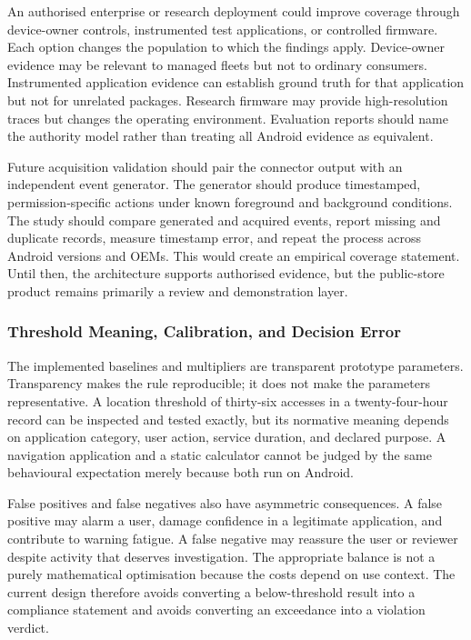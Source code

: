 An authorised enterprise or research deployment could improve coverage through device-owner controls, instrumented test applications, or controlled firmware. Each option changes the population to which the findings apply. Device-owner evidence may be relevant to managed fleets but not to ordinary consumers. Instrumented application evidence can establish ground truth for that application but not for unrelated packages. Research firmware may provide high-resolution traces but changes the operating environment. Evaluation reports should name the authority model rather than treating all Android evidence as equivalent.

Future acquisition validation should pair the connector output with an independent event generator. The generator should produce timestamped, permission-specific actions under known foreground and background conditions. The study should compare generated and acquired events, report missing and duplicate records, measure timestamp error, and repeat the process across Android versions and OEMs. This would create an empirical coverage statement. Until then, the architecture supports authorised evidence, but the public-store product remains primarily a review and demonstration layer.

\subsubsection{Threshold Meaning, Calibration, and Decision Error}

The implemented baselines and multipliers are transparent prototype parameters. Transparency makes the rule reproducible; it does not make the parameters representative. A location threshold of thirty-six accesses in a twenty-four-hour record can be inspected and tested exactly, but its normative meaning depends on application category, user action, service duration, and declared purpose. A navigation application and a static calculator cannot be judged by the same behavioural expectation merely because both run on Android.

False positives and false negatives also have asymmetric consequences. A false positive may alarm a user, damage confidence in a legitimate application, and contribute to warning fatigue. A false negative may reassure the user or reviewer despite activity that deserves investigation. The appropriate balance is not a purely mathematical optimisation because the costs depend on use context. The current design therefore avoids converting a below-threshold result into a compliance statement and avoids converting an exceedance into a violation verdict.

